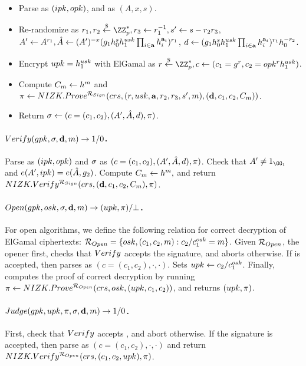 \begin{itemize}
\item Parse \gpk as $(ipk,opk)$, and \cred as $(A,x,s)$.
\item Re-randomize \cred as $r_1,r_2 \getr
  \ZZ^*_p, r_3 \gets r_1^{-1}, s' \gets s - r_2r_3$, $A' \gets A^{r_1},
  \hat{A} \gets (A')^{-x}(g_1h_0^sh_1^{usk}
  \prod_{i \in \mathbf{a}}h_i^{\mathbf{a}_i})^{r_1}$,
  $d \gets (g_1h_0^sh_1^{usk}
  \prod_{i \in \mathbf{a}}h_i^{\mathbf{a}_i})^{r_1}h_0^{-r_2}$.
\item Encrypt $upk=h_1^{usk}$ with ElGamal as $r \getr \ZZ^*_p,
  c \gets (c_1 = \gen{g}^r,c_2 = \opk^r\gen{h}_1^{\usk})$.
\item Compute $C_{m} \gets h^m$ and
  $\pi \gets NIZK.Prove^{\mathcal{R}_{Sign}}(crs,
  (r,usk,\mathbf{a},r_2,r_3,s',m), (\mathbf{d},c_1,c_2,C_{m}))$.
\item Return $\sigma \gets (c=(c_1,c_2),(A',\hat{A},d),\pi)$.
\end{itemize}

\paragraph{$Verify(gpk,\sigma,\mathbf{d},m) \rightarrow 1/0$.} %
Parse \gpk as $(ipk,opk)$ and $\sigma$ as $(c=(c_1,c_2),
(A',\hat{A},d), \pi)$. Check that $A' \neq 1_{\GG_1}$ and $e(A',ipk) =
e(\hat{A},g_2)$. Compute $C_{m} \gets h^m,$ and return
$NIZK.Verify^{\mathcal{R}_{Sign}}(crs,(\mathbf{d},c_1,c_2,C_{m}),
\pi)$.

\paragraph{$Open(gpk,osk,\sigma,\mathbf{d},m)
  \rightarrow (upk,\pi)/\bot$.} %
For open algorithms, we define the following relation for correct decryption of
ElGamal ciphertexts: $\mathcal{R}_{Open} = \lbrace osk,(c_1,c_2,m):
c_2/c_1^{osk} = m \rbrace$. Given $\mathcal{R}_{Open}$, the opener first,
checks that $Verify$ accepts the signature, and aborts otherwise. If \sig
is accepted, then parses \sig as $(c=(c_1,c_2),\cdot,\cdot)$.
Sets $upk \gets c_2/c_1^{osk}$. Finally, computes the proof of correct
decryption by running $\pi \gets NIZK.Prove^{\mathcal{R}_{Open}}(crs,
osk,(upk,c_1,c_2))$, and returns $(upk,\pi)$.

\paragraph{$Judge(gpk,upk,\pi,\sigma,\mathbf{d},m)
  \rightarrow 1/0$.} %
First, check that $Verify$ accepts \sig, and abort otherwise. If the signature
is accepted, then parse \sig as $(c=(c_1,c_2),\cdot,\cdot)$ and return
$NIZK.Verify^{\mathcal{R}_{Open}}(crs,(c_1,c_2,upk),\pi)$.

